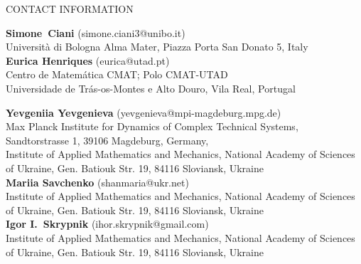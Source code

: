 \documentclass[a4paper,11pt,fullpage]{article}
\numberwithin{equation}{section}
\begin{document}
\newpage
{\small 
CONTACT INFORMATION

\medskip

{\bf Simone~Ciani} (simone.ciani3@unibo.it)\\
Universit\`a di Bologna Alma Mater, Piazza Porta San Donato 5, Italy\\


\medskip
{\bf Eurica Henriques} (eurica@utad.pt)\\
Centro de Matem\'atica CMAT; Polo CMAT-UTAD\\
Universidade de Tr\'as-os-Montes e Alto Douro, Vila Real, Portugal
  \\


\medskip 

{\bf Yevgeniia Yevgenieva} (yevgenieva@mpi-magdeburg.mpg.de)\\ 
Max Planck Institute for Dynamics of Complex Technical Systems, Sandtorstrasse 1, 39106 Magdeburg, Germany,\\
Institute of Applied Mathematics and Mechanics,
National Academy of Sciences of Ukraine, Gen. Batiouk Str. 19, 84116 Sloviansk, Ukraine\\


\medskip 
{\bf Mariia Savchenko} (shan\textunderscore maria@ukr.net)\\ Institute of Applied Mathematics and Mechanics,
National Academy of Sciences of Ukraine, Gen. Batiouk Str. 19, 84116 Sloviansk, Ukraine\\


\medskip
{\bf Igor I.~Skrypnik} (ihor.skrypnik@gmail.com)\\Institute of Applied Mathematics and Mechanics,
National Academy of Sciences of Ukraine, Gen. Batiouk Str. 19, 84116 Sloviansk, Ukraine\\

}
\end{document}
